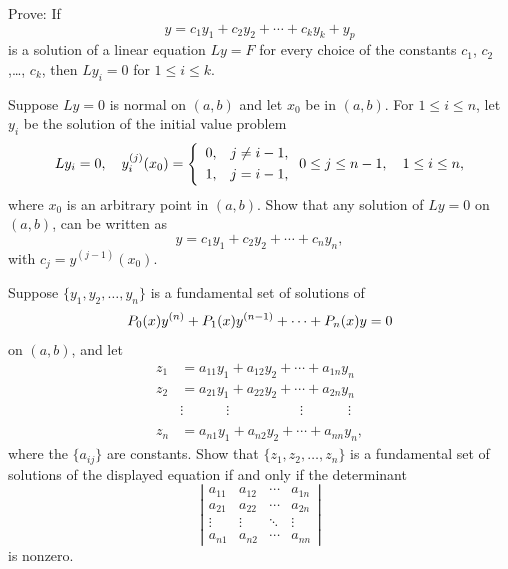 \begin{exerciselist}
  \item\label{exer:9.1.13} Prove: If
  \[
    y=c_{1}y_{1}+c_{2}y_{2}+\cdots+c_{k}y_{k}+y_{p}
  \]
  is a solution of a linear equation $Ly=F$ for every choice of the constants $c_{1}$, $c_{2}$
  ,\dots, $c_{k}$, then $Ly_{i}=0$ for $1\le i\le k$.

  \item\label{exer:9.1.14} Suppose $Ly=0$ is normal on $(a,b)$ and let $x_{0}$ be in $(a,b)$. For
        $1\le i\le n$, let $y_{i}$ be the solution of the initial value problem
  \[
    Ly_{i}=0,\quad y_{i}^{(j)}(x_{0})= \left\{
    \begin{array}{cl}
      0, & j\ne i-1, \\[1\jot]
      1, & j=i-1,
    \end{array}\right. 0\le j\le n-1,\quad 1\le i\le n,
  \]
  where $x_{0}$ is an arbitrary point in $(a,b)$. Show that any solution of $Ly=0$ on $(a,b)$, can
  be written as
  \[
    y=c_{1}y_{1}+c_{2}y_{2}+\cdots+c_{n}y_{n},
  \]
  with $c_{j}=y^{(j-1)}(x_{0})$.

  \item\label{exer:9.1.15} Suppose $\{y_{1},y_{2},\dots,y_{n}\}$ is a fundamental set of solutions
        of
  \[
    \displaystyle P_{0}(x)y^{(n)}+P_{1}(x)y^{(n-1)}+\cdots+P_{n}(x)y=0
  \]
  on $(a,b)$, and let
  \[
    \begin{array}{rl}
      z_{1}           & =a_{11}y_{1}+a_{12}y_{2}+\cdots+a_{1n}y_{n}                                                               \\
      z_{2}           & =a_{21}y_{1}+a_{22}y_{2}+\cdots+a_{2n}y_{n}                                                               \\
      \phantom{z_{1}} & \vdots\phantom{_{1}y_{1}+a}\vdots \phantom{_{2}y_{2}+\cdots+a}\vdots\phantom{_{n}y_{n}}\phantom{=b}\vdots \\
      z_{n}           & =a_{n1}y_{1}+a_{n2}y_{2}+\cdots+a_{nn}y_{n},
    \end{array}
  \]
  where the $\{a_{ij}\}$ are constants. Show that $\{z_{1},z_{2},\dots, z_{n}\}$ is a fundamental
  set of solutions of the displayed equation if and only if the determinant
  \[
    \left|
    \begin{array}{cccc}
      a_{11} & a_{12} & \cdots & a_{1n} \\
      a_{21} & a_{22} & \cdots & a_{2n} \\
      \vdots & \vdots & \ddots & \vdots \\
      a_{n1} & a_{n2} & \cdots & a_{nn}
    \end{array}\right|
  \]
  is nonzero.


\end{exerciselist}

